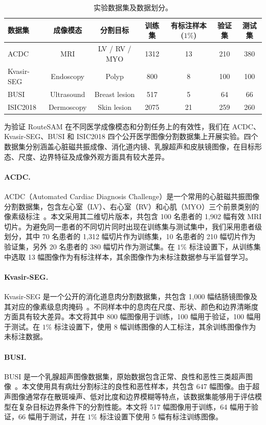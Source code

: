 \documentclass[UTF8,a4paper,10pt,twocolumn]{ctexart}
\begin{document}
\begin{table}[t]
\centering
\caption{实验数据集及数据划分。}
\label{tab:dataset_statistics}
\begin{tabular}{lcccccc}
\toprule
数据集 & 成像模态 & 分割目标 & 训练集 & 有标注样本 ($1\%$) & 验证集 & 测试集 \\
\midrule
ACDC        & MRI        & LV / RV / MYO   & 1312 & 13 & 210 & 380 \\
Kvasir-SEG  & Endoscopy  & Polyp            & 800  & 8  & 100 & 100 \\
BUSI        & Ultrasound & Breast lesion    & 517  & 5  & 64  & 66  \\
ISIC2018    & Dermoscopy & Skin lesion      & 2075 & 21 & 259 & 260 \\
\bottomrule
\end{tabular}
\end{table}


为验证 RouteSAM 在不同医学成像模态和分割任务上的有效性，我们在 ACDC、Kvasir-SEG、BUSI 和 ISIC2018 四个公开医学图像分割数据集上开展实验。四个数据集分别涵盖心脏磁共振成像、消化道内镜、乳腺超声和皮肤镜图像，在目标形态、尺度、边界特征及成像外观方面具有较大差异。

\paragraph{ACDC.}
ACDC（Automated Cardiac Diagnosis Challenge）是一个常用的心脏磁共振图像分割数据集，包含左心室（LV）、右心室（RV）和心肌（MYO）三个前景类别的像素级标注~\cite{bernard2018acdc}。本文采用其二维切片版本，共包含 100 名患者的 1,902 幅有效 MRI 切片。为避免同一患者的不同切片同时出现在训练集与测试集中，我们采用患者级划分，其中 70 名患者的 1,312 幅切片作为训练集，10 名患者的 210 幅切片作为验证集，另外 20 名患者的 380 幅切片作为测试集。在 $1\%$ 标注设置下，从训练集中选取 13 幅图像作为有标注样本，其余图像作为未标注数据参与半监督学习。

\paragraph{Kvasir-SEG.}
Kvasir-SEG 是一个公开的消化道息肉分割数据集，共包含 1,000 幅结肠镜图像及其对应的像素级息肉掩码~\cite{jha2020kvasirseg}。不同样本中的息肉在尺度、形状、颜色和边界清晰度方面具有较大差异。本文将其中 800 幅图像用于训练，100 幅用于验证，100 幅用于测试。在 $1\%$ 标注设置下，使用 8 幅训练图像的人工标注，其余训练图像作为未标注数据。

\paragraph{BUSI.}
BUSI 是一个乳腺超声图像数据集，原始数据包含正常、良性和恶性三类超声图像~\cite{aldhabyani2020busi}。本文使用具有病灶分割标注的良性和恶性样本，共包含 647 幅图像。由于超声图像通常存在散斑噪声、低对比度和边界模糊等特点，该数据集能够用于评估模型在复杂目标边界条件下的分割性能。本文将 517 幅图像用于训练，64 幅用于验证，66 幅用于测试，并在 $1\%$ 标注设置下使用 5 幅有标注训练图像。
\end{document}
